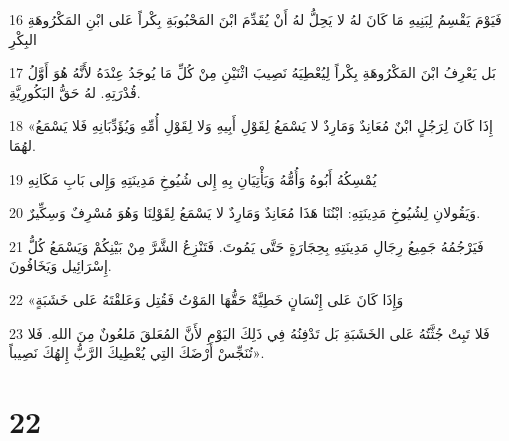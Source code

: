 \par 16 فَيَوْمَ يَقْسِمُ لِبَنِيهِ مَا كَانَ لهُ لا يَحِلُّ لهُ أَنْ يُقَدِّمَ ابْنَ المَحْبُوبَةِ بِكْراً عَلى ابْنِ المَكْرُوهَةِ البِكْرِ
\par 17 بَل يَعْرِفُ ابْنَ المَكْرُوهَةِ بِكْراً لِيُعْطِيَهُ نَصِيبَ اثْنَيْنِ مِنْ كُلِّ مَا يُوجَدُ عِنْدَهُ لأَنَّهُ هُوَ أَوَّلُ قُدْرَتِهِ. لهُ حَقُّ البَكُورِيَّةِ.
\par 18 «إِذَا كَانَ لِرَجُلٍ ابْنٌ مُعَانِدٌ وَمَارِدٌ لا يَسْمَعُ لِقَوْلِ أَبِيهِ وَلا لِقَوْلِ أُمِّهِ وَيُؤَدِّبَانِهِ فَلا يَسْمَعُ لهُمَا.
\par 19 يُمْسِكُهُ أَبُوهُ وَأُمُّهُ وَيَأْتِيَانِ بِهِ إِلى شُيُوخِ مَدِينَتِهِ وَإِلى بَابِ مَكَانِهِ
\par 20 وَيَقُولانِ لِشُيُوخِ مَدِينَتِهِ: ابْنُنَا هَذَا مُعَانِدٌ وَمَارِدٌ لا يَسْمَعُ لِقَوْلِنَا وَهُوَ مُسْرِفٌ وَسِكِّيرٌ.
\par 21 فَيَرْجُمُهُ جَمِيعُ رِجَالِ مَدِينَتِهِ بِحِجَارَةٍ حَتَّى يَمُوتَ. فَتَنْزِعُ الشَّرَّ مِنْ بَيْنِكُمْ وَيَسْمَعُ كُلُّ إِسْرَائِيل وَيَخَافُونَ.
\par 22 «وَإِذَا كَانَ عَلى إِنْسَانٍ خَطِيَّةٌ حَقُّهَا المَوْتُ فَقُتِل وَعَلقْتَهُ عَلى خَشَبَةٍ
\par 23 فَلا تَبِتْ جُثَّتُهُ عَلى الخَشَبَةِ بَل تَدْفِنُهُ فِي ذَلِكَ اليَوْمِ لأَنَّ المُعَلقَ مَلعُونٌ مِنَ اللهِ. فَلا تُنَجِّسْ أَرْضَكَ التِي يُعْطِيكَ الرَّبُّ إِلهُكَ نَصِيباً».

\chapter{22}

